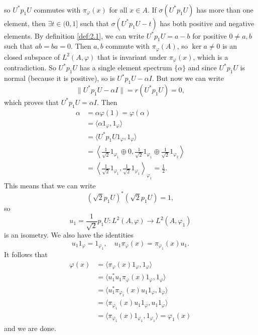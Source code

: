 \begin{myproof}
\begin{itemize}
\begin{align*}
    \end{align*}
    so $U^* p_1 U$ commutes with $\pi_{\varphi} (x)$ for all $x \in A$.
    If $\sigma(U^* p_1 U)$ has more than one element, then $\exists t \in (0, 1]$
    such that $\sigma(U^* p_1 U - t)$ has both positive and negative elements.
    By definition \ref{def:2.1}, we can write $U^* p_1 U = a - b$ for positive $0 \neq a, b$ such that $ab = ba = 0$.
    Then $a, b$ commute with $\pi_{\varphi} (A)$, so $\ker a \neq 0$ is an closed subspace of $L^2 (A, \varphi)$ that is invariant under $\pi_{\varphi} (x)$, which is a contradiction.
    So $U^* p_1 U$ has a single element spectrum $\{\alpha\}$ and since $U^* p_1 U$ is normal (because it is positive), so is $U^* p_1 U - \alpha I.$
    But now we can write 
    $$\| U^* p_1 U - \alpha I\| = r(U^* p_1 U) = 0,$$
    which proves that $U^* p_1 U = \alpha I$.
    Then
    \begin{align*}
      \alpha &= \alpha \varphi(1) = \varphi(\alpha)\\
      &= \langle \alpha 1_{\varphi}, 1_{\varphi} \rangle\\
      &= \langle U^* p_1 U 1_\varphi, 1_\varphi\rangle \\
      &= \left\langle \frac{1}{\sqrt{2}} 1_{\varphi_1} \oplus 0, \frac{1}{\sqrt{2}} 1_{\varphi_1} \oplus \frac{1}{\sqrt{2}} 1_{\varphi_2}\right\rangle \\
      &= \left\langle \frac{1}{\sqrt{2}} 1_{\varphi_1}, \frac{1}{\sqrt{2}} 1_{\varphi_1} \right\rangle _{\varphi_1} = \frac{1}{2}.
    \end{align*}
    This means that we can write 
    $$\left({\sqrt{2}} p_1 U \right)^* \left({\sqrt{2}} p_1 U \right) = 1,$$
    so $$u_1 = \frac{1}{\sqrt{2}} p_1 U : L^2 (A, \varphi) \to L^2 (A, \varphi_1)$$
    is an isometry. We also have the identities
    $$u_1 1_{\varphi} = 1_{\varphi_1},\quad u_1 \pi_{\varphi} (x) = \pi_{\varphi_1} (x) u_1.$$
    It follows that 
    \begin{align*}
      \varphi(x) &= \langle \pi_{\varphi} (x) 1_{\varphi}, 1_\varphi \rangle\\
      &= \langle u_1 ^* u_1 \pi_\varphi (x) 1_\varphi, 1_\varphi\rangle\\
      &= \langle u_1 ^* \pi_{\varphi_1} (x) u_1 1_\varphi, 1_\varphi\rangle\\
      &= \langle \pi_{\varphi_1} (x) u_1 1_\varphi, u_1 1_\varphi\rangle\\
      &= \langle \pi_{\varphi_1} (x) 1_{\varphi_1}, 1_{\varphi_1} \rangle = \varphi_1(x)
    \end{align*}
    and we are done. \qedhere
  \end{itemize}
\end{myproof}

